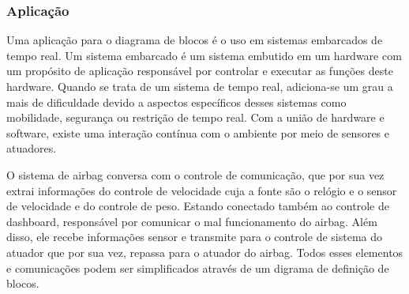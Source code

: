     \subsubsection{Aplicação}
    
Uma aplicação para o diagrama de blocos é o uso em sistemas embarcados de tempo real. Um sistema embarcado é um sistema embutido em um hardware com um propósito de aplicação responsável por controlar e executar as funções deste hardware. Quando se trata de um sistema de tempo real, adiciona-se um grau a mais de dificuldade devido a aspectos específicos desses sistemas como mobilidade, segurança ou restrição de tempo real. Com a união de hardware e software, existe uma interação contínua com o ambiente por meio de sensores e atuadores. 

O sistema de airbag conversa com o controle de comunicação, que por sua vez extrai informações do controle de velocidade cuja a fonte são o relógio e o sensor de velocidade e do controle de peso. Estando conectado também ao controle de dashboard, responsável por comunicar o mal funcionamento do airbag. Além disso, ele recebe informações sensor e transmite para o controle de sistema do atuador que por sua vez, repassa para o atuador do airbag. Todos esses elementos e comunicações podem ser simplificados através de um digrama de definição de blocos.
